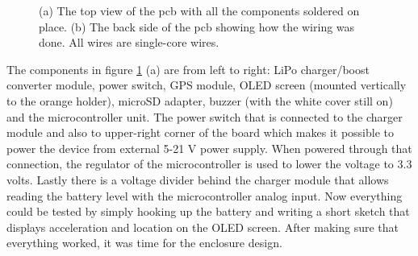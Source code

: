 \documentclass[a4paper,11pt]{article}
\begin{document}
\begin{figure}[H]
    \hfill
    \hfill
    \hfill
    \caption{(a) The top view of the pcb with all the components soldered on place. (b) The back side of the pcb showing how the wiring was done. All wires are single-core wires.}
    \label{fig:pcb_plain}
\end{figure}

The components in figure \ref{fig:pcb_plain} (a) are from left to right: LiPo charger/boost converter module, power switch, GPS module, OLED screen (mounted vertically to the orange holder), microSD adapter, buzzer (with the white cover still on) and the microcontroller unit. The power switch that is connected to the charger module and also to upper-right corner of the board which makes it possible to power the device from external 5-21 V power supply. When powered through that connection, the regulator of the microcontroller is used to lower the voltage to 3.3 volts. Lastly there is a voltage divider behind the charger module that allows reading the battery level with the microcontroller analog input. Now everything could be tested by simply hooking up the battery and writing a short sketch that displays acceleration and location on the OLED screen. After making sure that everything worked, it was time for the enclosure design.
\end{document}
